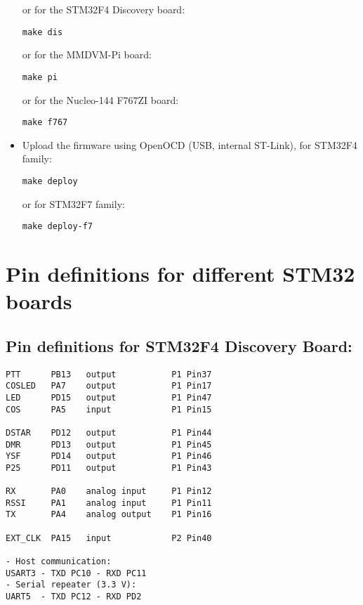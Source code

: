 \documentclass[]{article}
\begin{document}
\begin{itemize}[leftmargin=*]
or for the STM32F4 Discovery board:
\begin{lstlisting}[style=DOS]
make dis
\end{lstlisting}

or for the MMDVM-Pi board:
\begin{lstlisting}[style=DOS]
make pi
\end{lstlisting}

or for the Nucleo-144 F767ZI board:
\begin{lstlisting}[style=DOS]
make f767
\end{lstlisting}

\item Upload the firmware using OpenOCD (USB, internal ST-Link), for STM32F4 family:
\begin{lstlisting}[style=DOS]
make deploy
\end{lstlisting}

or for STM32F7 family:
\begin{lstlisting}[style=DOS]
make deploy-f7
\end{lstlisting}

\end{itemize}

\section{Pin definitions for different STM32 boards}

\subsection{Pin definitions for STM32F4 Discovery Board:}

\begin{verbatim}
PTT      PB13   output           P1 Pin37
COSLED   PA7    output           P1 Pin17
LED      PD15   output           P1 Pin47
COS      PA5    input            P1 Pin15

DSTAR    PD12   output           P1 Pin44
DMR      PD13   output           P1 Pin45
YSF      PD14   output           P1 Pin46
P25      PD11   output           P1 Pin43

RX       PA0    analog input     P1 Pin12
RSSI     PA1    analog input     P1 Pin11
TX       PA4    analog output    P1 Pin16

EXT_CLK  PA15   input            P2 Pin40

- Host communication:
USART3 - TXD PC10 - RXD PC11
- Serial repeater (3.3 V):
UART5  - TXD PC12 - RXD PD2
\end{verbatim}
\end{document}
